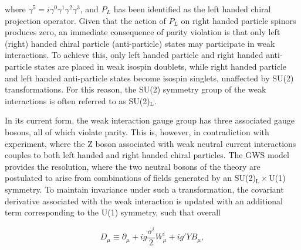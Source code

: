 \noindent where $\gamma^{5}=i\gamma^{0}\gamma^{1}\gamma^{2}\gamma^{3}$, and $P_{L}$ has been identified as the left handed chiral projection operator. Given that the action of $P_{L}$ on right handed particle spinors produces zero, an immediate consequence of parity violation is that only left (right) handed chiral particle (anti-particle) states may participate in weak interactions. To achieve this, only left handed particle and right handed anti-particle states are placed in weak isospin doublets, while right handed particle and left handed anti-particle states become isospin singlets, unaffected by SU(2) transformations. For this reason, the SU(2) symmetry group of the weak interactions is often referred to as SU(2)$_{\mathrm{L}}$. %

In its current form, the weak interaction gauge group has three associated gauge bosons, all of which violate parity. This is, however, in contradiction with experiment, where the $\mathrm{Z}$ boson associated with weak neutral current interactions couples to both left handed and right handed chiral particles. The GWS model provides the resolution, where the two neutral bosons of the theory are postulated to arise from combinations of fields generated by an SU(2)$_{\mathrm{L}}\times$U(1) symmetry. To maintain invariance under such a transformation, the covariant derivative associated with the weak interaction is updated with an additional term corresponding to the U(1) symmetry, such that overall

\begin{equation}
\label{eqn:ew_covariant_derivative}
    D_\mu \equiv \partial_\mu + ig\frac{\sigma^{i}}{2}W_{\mu}^{i} + ig'YB_{\mu},
\end{equation}

